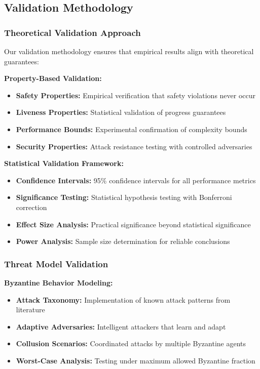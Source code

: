 \documentclass[conference]{IEEEtran}
\begin{document}
\subsection{Validation Methodology}

\subsubsection{Theoretical Validation Approach}

Our validation methodology ensures that empirical results align with theoretical guarantees:

\textbf{Property-Based Validation:}
\begin{itemize}
    \item \textbf{Safety Properties:} Empirical verification that safety violations never occur
    \item \textbf{Liveness Properties:} Statistical validation of progress guarantees
    \item \textbf{Performance Bounds:} Experimental confirmation of complexity bounds
    \item \textbf{Security Properties:} Attack resistance testing with controlled adversaries
\end{itemize}

\textbf{Statistical Validation Framework:}
\begin{itemize}
    \item \textbf{Confidence Intervals:} 95\% confidence intervals for all performance metrics
    \item \textbf{Significance Testing:} Statistical hypothesis testing with Bonferroni correction
    \item \textbf{Effect Size Analysis:} Practical significance beyond statistical significance
    \item \textbf{Power Analysis:} Sample size determination for reliable conclusions
\end{itemize}

\subsubsection{Threat Model Validation}

\textbf{Byzantine Behavior Modeling:}
\begin{itemize}
    \item \textbf{Attack Taxonomy:} Implementation of known attack patterns from literature
    \item \textbf{Adaptive Adversaries:} Intelligent attackers that learn and adapt
    \item \textbf{Collusion Scenarios:} Coordinated attacks by multiple Byzantine agents
    \item \textbf{Worst-Case Analysis:} Testing under maximum allowed Byzantine fraction
\end{itemize}
\end{document}
